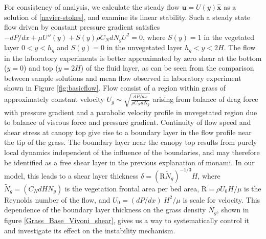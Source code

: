 \documentclass[aps,prl,reprint,twocolumn,showpacs,superscriptaddress,10pt]{revtex4-1}  %
\newcommand{\bu}{\mathbf{u}}
\newcommand{\hg}{h_g}
\newcommand{\Rey}{\text{R}}
\newcommand{\Ndg}{\tilde{N}_g}
\begin{document}
For consistency of analysis, we calculate the steady flow $\bu = U(y)\boldsymbol{\hat{x}}$ as a solution of \eqref{navier-stokes}, and examine its linear stability. 
Such a steady state flow driven by constant pressure gradient satisfies $-{dP}/{dx}+\mu U''(y) +S(y) \rho C_N d N_gU^2=0$, where $S(y)=1$ in the vegetated layer $0<y<\hg$ and $S(y)=0$ in the unvegetated layer $\hg< y< 2H$.
The flow in the laboratory experiments is better approximated by zero shear at the bottom ($y=0$) and top ($y=2H$) of the fluid layer, as can be seen from the comparison between sample solutions and mean flow observed in laboratory experiment shown in Figure \ref{fig:basicflow}. 
Flow consist of a region within grass of approximately constant velocity $U_g \sim \sqrt{\frac{dP/dx}{\rho C_N dN_g}}$ arising from balance of drag force with pressure gradient and a parabolic velocity profile in unvegetated region due to balance of viscous force and pressure gradient. 
Continuity of flow speed and shear stress at canopy top give rise to a boundary layer in the flow profile near the tip of the grass. 
The boundary layer near the canopy top results from purely local dynamics independent of the influence of the boundaries, and may therefore be identified as a free shear layer\cite{Ghisal02} in the previous explanation of monami. 
In our model, this leads to a shear layer thickness $\delta = (\Rey\Ndg)^{-1/3} H$, where $\Ndg = \left(C_N d H N_g\right)$ is the vegetation frontal area per bed area, $\Rey=\rho U_0 H/\mu$ is the Reynolds number of the flow, and $U_0 = {(dP/dx)~H^2}/{\mu}$ is scale for velocity. 
This dependence of the boundary layer thickness on the grass density $N_g$, shown in figure \ref{Grass_Base_Vivoni_shear}, gives us a way to systematically control it and investigate its effect on the instability mechanism. 
\end{document}
